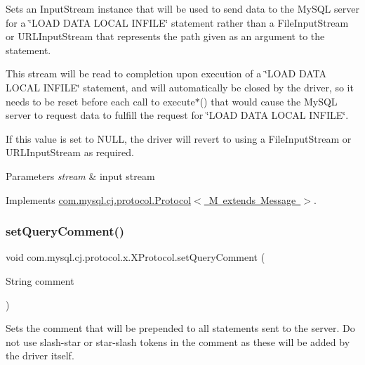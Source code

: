 Sets an Input\+Stream instance that will be used to send data to the My\+S\+QL server for a \char`\"{}\+L\+O\+A\+D D\+A\+T\+A L\+O\+C\+A\+L I\+N\+F\+I\+L\+E\char`\"{} statement rather than a File\+Input\+Stream or U\+R\+L\+Input\+Stream that represents the path given as an argument to the statement.

This stream will be read to completion upon execution of a \char`\"{}\+L\+O\+A\+D D\+A\+T\+A L\+O\+C\+A\+L I\+N\+F\+I\+L\+E\char`\"{} statement, and will automatically be closed by the driver, so it needs to be reset before each call to execute$\ast$() that would cause the My\+S\+QL server to request data to fulfill the request for \char`\"{}\+L\+O\+A\+D D\+A\+T\+A L\+O\+C\+A\+L I\+N\+F\+I\+L\+E\char`\"{}.

If this value is set to N\+U\+LL, the driver will revert to using a File\+Input\+Stream or U\+R\+L\+Input\+Stream as required.


\begin{DoxyParams}{Parameters}
{\em stream} & input stream \\
\hline
\end{DoxyParams}


Implements \mbox{\hyperlink{interfacecom_1_1mysql_1_1cj_1_1protocol_1_1_protocol_a995483a591a66d63e273140ef0ac47e7}{com.\+mysql.\+cj.\+protocol.\+Protocol$<$ M extends Message $>$}}.

\mbox{\label{classcom_1_1mysql_1_1cj_1_1protocol_1_1x_1_1_x_protocol_ab009a2b06f09d53869c8983bed6c96b8}} 
\subsubsection{\texorpdfstring{set\+Query\+Comment()}{setQueryComment()}}
{\footnotesize\ttfamily void com.\+mysql.\+cj.\+protocol.\+x.\+X\+Protocol.\+set\+Query\+Comment (\begin{DoxyParamCaption}\item[{String}]{comment }\end{DoxyParamCaption})}

Sets the comment that will be prepended to all statements sent to the server. Do not use slash-\/star or star-\/slash tokens in the comment as these will be added by the driver itself.


